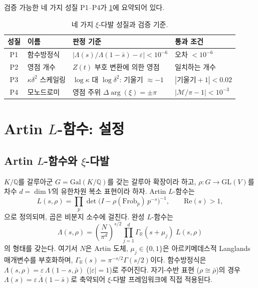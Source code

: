 \documentclass[11pt, a4paper]{article}
\theoremstyle{plain}
\theoremstyle{definition}
\newcommand{\abs}[1]{\left|#1\right|}
\newcommand{\Lam}{\Lambda}             %
\newcommand{\kap}{\kappa}             %
\newcommand{\mono}{\mathcal{M}}       %
\newcommand{\Gal}{\mathrm{Gal}}       %
\newcommand{\Frob}{\mathrm{Frob}}     %
\begin{document}
검증 가능한 네 가지 성질 P1--P4가 \cref{tab:properties}에 요약되어 있다.

\begin{table}[ht]
\centering
\caption{네 가지 $\xi$-다발 성질과 검증 기준.}
\label{tab:properties}
\begin{tabular}{@{}clll@{}}
\toprule
\textbf{성질} & \textbf{이름} & \textbf{판정 기준} & \textbf{통과 조건} \\
\midrule
P1 & 함수방정식 & $\abs{\Lam(s)/\Lam(1-\bar{s}) - \varepsilon} < 10^{-6}$ & 오차 $< 10^{-6}$ \\
P2 & 영점 개수 & $Z(t)$ 부호 변환에 의한 영점 & 일치하는 개수 \\
P3 & $\kap\delta^{2}$ 스케일링 & $\log\kap$ 대 $\log\delta^{2}$: 기울기 $\approx -1$ & $\abs{\text{기울기}+1} < 0.02$ \\
P4 & 모노드로미 & 영점 주위 $\Delta\arg(\xi) = \pm\pi$ & $\abs{\mono/\pi - 1} < 10^{-3}$ \\
\bottomrule
\end{tabular}
\end{table}


\section{Artin $L$-함수: 설정}
\label{sec:artin-setup}

\subsection{Artin $L$-함수와 $\xi$-다발}
\label{sec:artin-general}

$K/\mathbb{Q}$를 갈루아군 $G = \Gal(K/\mathbb{Q})$를 갖는 갈루아 확장이라 하고,
$\rho\colon G \to \mathrm{GL}(V)$를 차수 $d = \dim V$의 유한차원 복소 표현이라 하자.
Artin $L$-함수는
\[
  L(s, \rho) = \prod_{p} \det\!\bigl(I - \rho(\Frob_{p})\,p^{-s}
  \bigr)^{-1},
  \qquad \mathrm{Re}(s) > 1,
\]
으로 정의되며, 곱은 비분지 소수에 걸친다. 완성 $L$-함수는
\[
  \Lam(s, \rho) = \left(\frac{N}{\pi^{d}}\right)^{s/2}
  \prod_{j=1}^{d} \Gamma_{\mathbb{R}}(s + \mu_{j})\;L(s,\rho)
\]
의 형태를 갖는다. 여기서 $N$은 Artin 도체, $\mu_{j} \in \{0,1\}$은
아르키메데스적 Langlands 매개변수를 부호화하며,
$\Gamma_{\mathbb{R}}(s) = \pi^{-s/2}\Gamma(s/2)$이다.
함수방정식은 $\Lam(s,\rho) = \varepsilon\,\Lam(1-s,\bar{\rho})$
($\abs{\varepsilon}=1$)로 주어진다. 자기-수반 표현 ($\rho \cong \bar{\rho}$)의 경우
$\Lam(s) = \varepsilon\,\overline{\Lam}(1-\bar{s})$로 축약되어
$\xi$-다발 프레임워크에 직접 적용된다.
\end{document}
